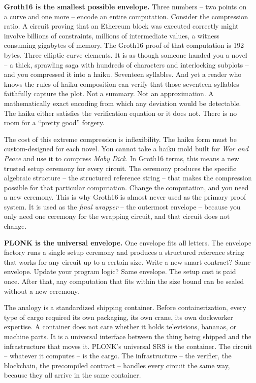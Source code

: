\documentclass[
  11pt,
  openany]{report}
\renewcommand{\textbf}[1]{{\bfseries\color{MidnightBold}#1}}
\begin{document}
\textbf{Groth16 is the smallest possible envelope.} Three numbers -- two points
on a curve and one more -- encode an entire computation. Consider the
compression ratio. A circuit proving that an Ethereum block was executed
correctly might involve billions of constraints, millions of intermediate
values, a witness consuming gigabytes of memory. The Groth16 proof of that
computation is 192 bytes. Three elliptic curve elements. It is as though someone
handed you a novel -- a thick, sprawling saga with hundreds of characters and
interlocking subplots -- and you compressed it into a haiku. Seventeen
syllables. And yet a reader who knows the rules of haiku composition can verify
that those seventeen syllables faithfully capture the plot. Not a summary. Not
an approximation. A mathematically exact encoding from which any deviation would
be detectable. The haiku either satisfies the verification equation or it does
not. There is no room for a ``pretty good'' forgery.

The cost of this extreme compression is inflexibility. The haiku form must be
custom-designed for each novel. You cannot take a haiku mold built for \emph{War
and Peace} and use it to compress \emph{Moby Dick}. In Groth16 terms, this means
a new trusted setup ceremony for every circuit. The ceremony produces the
specific algebraic structure -- the structured reference string -- that makes
the compression possible for that particular computation. Change the
computation, and you need a new ceremony. This is why Groth16 is almost never
used as the primary proof system. It is used as the \emph{final wrapper} -- the
outermost envelope -- because you only need one ceremony for the wrapping
circuit, and that circuit does not change.

\textbf{PLONK is the universal envelope.} One envelope fits all letters. The
envelope factory runs a single setup ceremony and produces a structured
reference string that works for any circuit up to a certain size. Write a new
smart contract? Same envelope. Update your program logic? Same envelope. The
setup cost is paid once. After that, any computation that fits within the size
bound can be sealed without a new ceremony.

The analogy is a standardized shipping container. Before containerization, every
type of cargo required its own packaging, its own crane, its own dockworker
expertise. A container does not care whether it holds televisions, bananas, or
machine parts. It is a universal interface between the thing being shipped and
the infrastructure that moves it. PLONK's universal SRS is the container. The
circuit -- whatever it computes -- is the cargo. The infrastructure -- the
verifier, the blockchain, the precompiled contract -- handles every circuit the
same way, because they all arrive in the same container.
\end{document}
